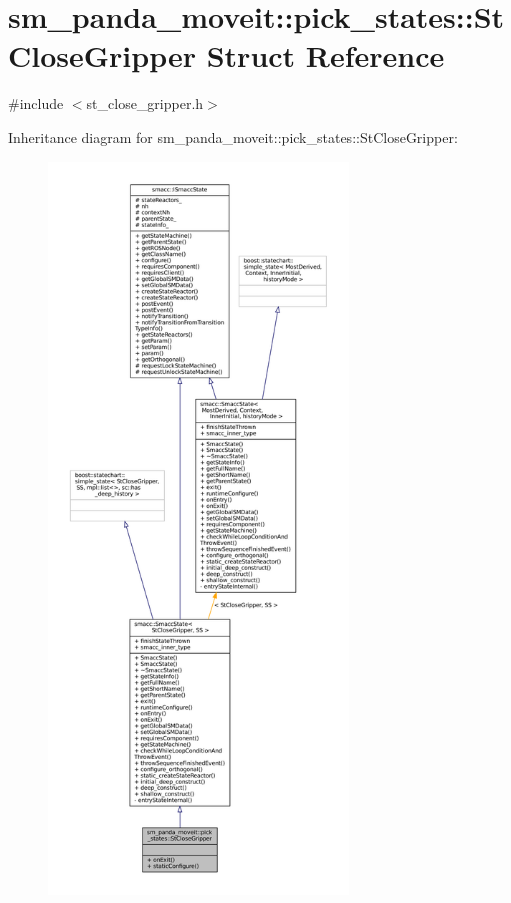 \hypertarget{structsm__panda__moveit_1_1pick__states_1_1StCloseGripper}{}\section{sm\+\_\+panda\+\_\+moveit\+:\+:pick\+\_\+states\+:\+:St\+Close\+Gripper Struct Reference}
\label{structsm__panda__moveit_1_1pick__states_1_1StCloseGripper}


{\ttfamily \#include $<$st\+\_\+close\+\_\+gripper.\+h$>$}



Inheritance diagram for sm\+\_\+panda\+\_\+moveit\+:\+:pick\+\_\+states\+:\+:St\+Close\+Gripper\+:
\nopagebreak
\begin{figure}[H]
\begin{center}
\leavevmode
\includegraphics[height=550pt]{structsm__panda__moveit_1_1pick__states_1_1StCloseGripper__inherit__graph}
\end{center}
\end{figure}


